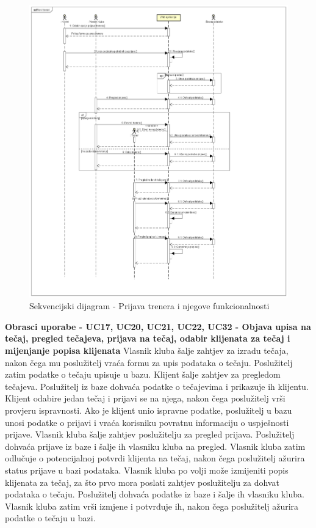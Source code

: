 		\begin{figure}[H]
			\includegraphics[scale=0.4]{slike/SD-prijavaTrenera.PNG} %
			\centering
			\caption{Sekvencijski dijagram - Prijava trenera i njegove funkcionalnosti}
			\label{fig:trener}
		\end{figure}
		
				\noindent \textbf {Obrasci uporabe - UC17, UC20, UC21, UC22, UC32 - Objava upisa na tečaj, pregled tečajeva, prijava na tečaj, odabir klijenata za tečaj i mijenjanje popisa klijenata} 
Vlasnik kluba šalje zahtjev za izradu tečaja, nakon čega mu poslužitelj vraća formu za upis podataka o tečaju. Poslužitelj zatim podatke o tečaju upisuje u bazu. Klijent šalje zahtjev za pregledom tečajeva. Poslužitelj iz baze dohvaća podatke o tečajevima i prikazuje ih klijentu. Klijent odabire jedan tečaj i prijavi se na njega, nakon čega poslužitelj vrši provjeru ispravnosti. Ako je klijent unio ispravne podatke, poslužitelj u bazu unosi podatke o prijavi i vraća korisniku povratnu informaciju o uspješnosti prijave. Vlasnik kluba šalje zahtjev poslužitelju za pregled prijava. Poslužitelj dohvaća prijave iz baze i šalje ih vlasniku kluba na pregled. Vlasnik kluba zatim odlučuje o potencijalnoj potvrdi klijenta na tečaj, nakon čega poslužitelj ažurira status prijave u bazi podataka. Vlasnik kluba po volji može izmijeniti popis klijenata za tečaj, za što prvo mora poslati zahtjev poslužitelju za dohvat podataka o tečaju. Poslužitelj dohvaća podatke iz baze i šalje ih vlasniku kluba. Vlasnik kluba zatim vrši izmjene i potvrđuje ih, nakon čega poslužitelj ažurira podatke o tečaju u bazi.

